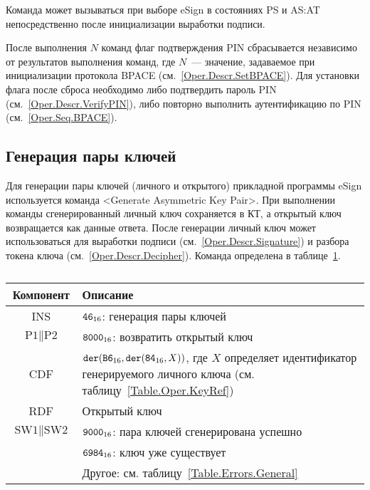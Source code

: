 Команда может вызываться при выборе eSign в состояниях 
PS и AS:AT непосредственно после инициализации выработки подписи.
%

После выполнения $N$ команд флаг подтверждения PIN сбрасывается независимо от 
результатов выполнения команд, где $N$~--- значение, 
задаваемое при инициализации протокола BPACE (см.~\ref{Oper.Descr.SetBPACE}).
%
Для установки флага после сброса необходимо либо подтвердить пароль PIN 
(см.~\ref{Oper.Descr.VerifyPIN}), либо повторно выполнить аутентификацию по PIN 
(см.~\ref{Oper.Seq.BPACE}). 

\subsection{Генерация пары ключей}\label{Oper.Descr.GenKeys}

Для генерации пары ключей (личного и открытого) прикладной 
программы eSign используется команда <Generate Asymmetric Key Pair>. При 
выполнении команды сгенерированный личный ключ сохраняется в КТ,
а открытый ключ возвращается как данные ответа.
После генерации личный ключ может использоваться 
для выработки подписи (см.~\ref{Oper.Descr.Signature}) и
разбора токена ключа (см.~\ref{Oper.Descr.Decipher}).
Команда определена в таблице~\ref{Table.Oper.GenKeysCmd}.

\begin{table}[hbt]
\caption{}\label{Table.Oper.GenKeysCmd}
\begin{tabular}{|c|p{14cm}|}
\hline
Компонент & Описание\\
\hline
\hline
INS & $\texttt{46}_{16}$: генерация пары ключей\\
\hline
$\text{P1} \parallel\text{P2}$ & $\texttt{8000}_{16}$:
возвратить открытый ключ \\
\hline
CDF & $\texttt{der}(\texttt{B6}_{16},\texttt{der}(\texttt{84}_{16}, X))$,
где $X$ определяет идентификатор генерируемого личного ключа
(см. таблицу~\ref{Table.Oper.KeyRef}) \\
\hline 
\hline
RDF & Открытый ключ\\
\hline
$\text{SW1} \parallel \text{SW2}$ & 
$\texttt{9000}_{16}$: пара ключей сгенерирована успешно\\
\cline{2-2}
  & $\texttt{6984}_{16}$: ключ уже существует \\
\cline{2-2}
  & Другое: см. таблицу~\ref{Table.Errors.General} \\
\hline
\end{tabular}
\end{table}


